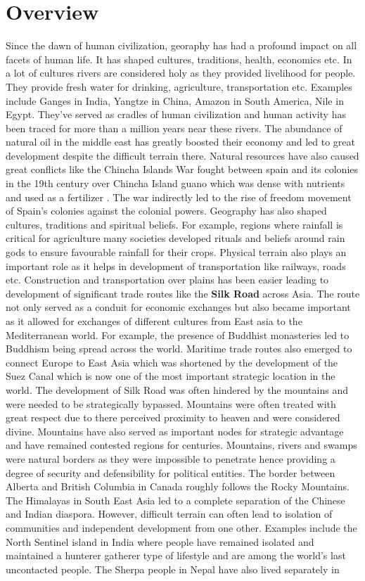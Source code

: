 \section{Overview}
Since the dawn of human civilization, georaphy has had a profound impact on all facets of human life. It has shaped cultures, traditions, health, economics etc. In a lot of cultures rivers are considered holy as they provided livelihood for people. They provide fresh water for drinking, agriculture, transportation etc. Examples include Ganges in India, Yangtze in China, Amazon in South America, Nile in Egypt. They've served as cradles of human civilization and human activity has been traced for more than a million years near these rivers. The abundance of natural oil in the middle east has greatly boosted their economy and led to great development despite the difficult terrain there. Natural resources have also caused great conflicts like the Chincha Islands War fought between spain and its colonies in the 19th century over Chincha Island guano which was dense with nutrients and used as a fertilizer \citep{sheldon2017french}. The war indirectly led to the rise of freedom movement of Spain's colonies against the colonial powers. Geography has also shaped cultures, traditions and spiritual beliefs. For example, regions where rainfall is critical for agriculture many societies developed rituals and beliefs around rain gods  to ensure favourable rainfall for their crops.   Physical terrain also plays an important role as it helps in development of transportation like railways, roads etc. Construction and transportation over plains has been easier leading to development of significant trade routes like the \textbf{Silk Road} across Asia. The route not only served as a conduit for economic exchanges but also became important as it allowed for exchanges of different cultures from East asia to the Mediterranean world. For example, the presence of Buddhist monasteries led to Buddhism being spread across the world. Maritime trade routes also emerged to connect Europe to East Asia which was shortened by the development of the Suez Canal which is now one of the most important strategic location in the world. The development of Silk Road was often hindered by the mountains and were needed to be strategically bypassed. Mountains were often treated with great respect due to there perceived proximity to heaven and were considered divine. Mountains have also served as important nodes for strategic advantage and have remained contested regions for centuries. Mountains, rivers and swamps were natural borders as they were impossible to penetrate hence providing a degree of security and defensibility for political entities. The border between Alberta and British Columbia in Canada roughly follows the Rocky Mountains.  The Himalayas in South East Asia led to a complete separation of the Chinese and Indian diaspora. However, difficult terrain can often lead to isolation of communities and independent development from one other. Examples include the North Sentinel island in India where people have remained isolated and maintained a hunterer gatherer type of lifestyle and are among the world's last uncontacted people. The Sherpa people in Nepal have also lived separately in 